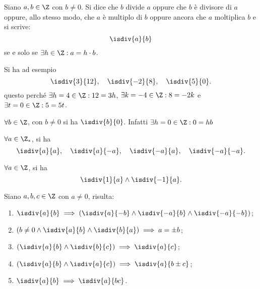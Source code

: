 \begin{definition}[divisibilità]\label{def:divisibilità}
    Siano \(a,b \in \Z\) con \(b \neq 0\). Si dice che \(b\) divide \(a\) oppure che \(b\) è divisore di \(a\) oppure, allo stesso modo, che \(a\) è multiplo di \(b\) oppure ancora che \(a\) moltiplica \(b\) e si scrive:
    \[
        \isdiv{a}{b}
    \]
    se e solo se \(\exists h \in \Z : a = h \cdot b\).
\end{definition}

\begin{example}
    Si ha ad esempio
    \[
        \isdiv{3}{12}, \quad
        \isdiv{-2}{8}, \quad
        \isdiv{5}{0}.
    \]
    questo perché \(\exists h = 4 \in \Z : 12 = 3h\), \(\exists k = -4 \in \Z : 8 = -2k\) e \(\exists t = 0 \in \Z : 5 = 5t\).
\end{example}

\begin{remark}
    \(\forall b \in \Z\), con \(b \neq 0\) si ha \(\isdiv{b}{0}\). Infatti \(\exists h = 0 \in \Z : 0 = hb\)
\end{remark}
\begin{remark}
    \(\forall a \in \Z_*\), si ha
    \[
        \isdiv{a}{a}, \quad
        \isdiv{a}{{-}a}, \quad
        \isdiv{{-}a}{a}, \quad
        \isdiv{{-}a}{{-}a}.
    \]
\end{remark}
\begin{remark}
    \(\forall a \in \Z\), si ha
    \[
        \isdiv{1}{a} \land \isdiv{-1}{a}.
    \]
\end{remark}


\begin{proposition}\label{prop:proprietà_divisibilità}
    Siano \(a,b,c \in \Z\) con \(a \neq 0\), risulta:
    \begin{enumerate}
        \item \(\isdiv{a}{b} \implies \left(\isdiv{a}{{-}b} \land \isdiv{{-}a}{b} \land \isdiv{{-}a}{{-}b}\right)\);
        \item \(\left(b \neq 0 \land \isdiv{a}{b} \land \isdiv{b}{a}\right) \implies a = \pm b\);
        \item \((\isdiv{a}{b} \land \isdiv{b}{c}) \implies \isdiv{a}{c}\);
        \item \((\isdiv{a}{b} \land \isdiv{a}{c}) \implies \isdiv{a}{b \pm c}\);
        \item \(\isdiv{a}{b} \implies \isdiv{a}{bc}\).
    \end{enumerate}
\end{proposition}

